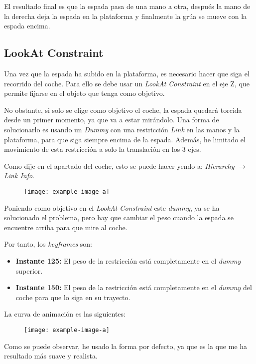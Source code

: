 \bigskip

El resultado final es que la espada pasa de una mano a otra, después la mano de la derecha deja la espada en la plataforma y finalmente la grúa se mueve con la espada encima.


\subsection{LookAt Constraint}

Una vez que la espada ha subido en la plataforma, es necesario hacer que siga el recorrido del coche. Para ello se debe usar un \textit{LookAt Constraint} en el eje Z, que permite fijarse en el objeto que tenga como objetivo. 

\bigskip

No obstante, si solo se elige como objetivo el coche, la espada quedará torcida desde un primer momento, ya que va a estar mirándolo. Una forma de solucionarlo es usando un \textit{Dummy} con una restricción \textit{Link} en las manos y la plataforma, para que siga siempre encima de la espada. Además, he limitado el movimiento de esta restricción a solo la translación en los 3 ejes.

\bigskip

Como dije en el apartado del coche, esto se puede hacer yendo a: \textit{Hierarchy} $\rightarrow$ \textit{Link Info}.

\begin{figure}[H]
    \centering
   \texttt{[image: example-image-a]}
\end{figure}

Poniendo como objetivo en el \textit{LookAt Constraint} este \textit{dummy}, ya se ha solucionado el problema, pero hay que cambiar el peso cuando la espada se encuentre arriba para que mire al coche.

\bigskip

Por tanto, los \textit{keyframes} son:

\begin{itemize}
    \item \textbf{Instante 125: }El peso de la restricción está completamente en el \textit{dummy} superior.
    \item \textbf{Instante 150: }El peso de la restricción está completamente en el \textit{dummy} del coche para que lo siga en su trayecto.
\end{itemize}

\bigskip

La curva de animación es las siguientes:

\begin{figure}[H]
    \centering
   \texttt{[image: example-image-a]}
\end{figure}

Como se puede observar, he usado la forma por defecto, ya que es la que me ha resultado más suave y realista.
